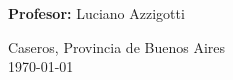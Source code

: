 \begin{titlepage}
    \thispagestyle{empty} %

    \begin{center}
    
        \vspace*{2cm}

        

        \vspace{1cm}
        {\large \textbf{\universidad}}\\
        {\large \carrera}\\
        {\large \catedra}

        \vspace{3cm}

            {\LARGE \textbf{\tituloDocumento}}

        
        \vspace{2cm}
        
        {\large \subtitulo}

        \vspace{2cm}

        {\Large \textbf{\autor}}

        \vspace{2cm}

        {\large \textbf{Profesor:} Luciano Azzigotti}\\

        \vfill

        {\large Caseros, Provincia de Buenos Aires}\\
        {\large \today}

    \end{center}
\restoregeometry %
\end{titlepage}